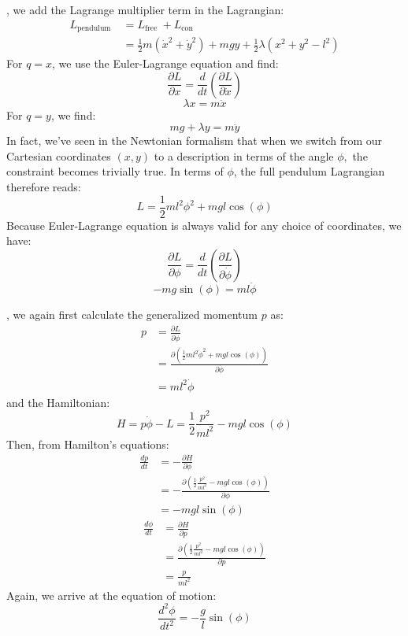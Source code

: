\textbf{}, we add the Lagrange multiplier term in the Lagrangian:
\begin{equation}
\begin{aligned}
L_{\text {pendulum }} &=L_{\text {free }}+L_{\text {con }} \\
&=\frac{1}{2} m\left(\dot{x}^{2}+\dot{y}^{2}\right)+m g y+\frac{1}{2} \lambda\left(x^{2}+y^{2}-l^{2}\right)
\end{aligned}
\end{equation}
For $q=x$, we use the Euler-Lagrange equation and find:
$$
\frac{\partial L}{\partial x}=\frac{d}{d t}\left(\frac{\partial L}{\partial \dot{x}}\right)
$$
$$
\lambda x=m \ddot{x}
$$
For $q=y$, we find:
$$
m g+\lambda y=m\ddot{y}
$$
In fact, we've seen in the Newtonian formalism that when we switch from our Cartesian coordinates $(x, y)$ to a description in terms of the angle $\phi,$ the constraint becomes trivially true. In terms of $\phi$, the full pendulum Lagrangian therefore reads:
$$
L=\frac{1}{2} m l^{2} \phi^{2}+m g l \cos (\phi)
$$
Because Euler-Lagrange equation is always valid for any choice of coordinates, we have:
$$
\frac{\partial L}{\partial \phi}=\frac{d}{d t}\left(\frac{\partial L}{\partial \dot{\phi}}\right)
$$
$$
-m g \sin (\phi)=m l  \ddot{\phi}
$$

\textbf{}, we again first calculate the generalized momentum $p$ as:
$$
\begin{aligned}
p &=\frac{\partial L}{\partial \dot{\phi}} \\
&=\frac{\partial\left(\frac{1}{2} m l^{2} \dot{\phi}^{2}+m g l \cos (\phi)\right)}{\partial \dot{\phi}} \\
&=m l^{2} \dot{\phi}
\end{aligned}
$$
and the Hamiltonian:
$$
H=p\dot{\phi}-L=\frac{1}{2} \frac{p^{2}}{m l^{2}}-m g l \cos (\phi)
$$
Then, from Hamilton's equations:
$$
\begin{aligned}
\frac{d p}{d t} &=-\frac{\partial H}{\partial \phi} \\
&=-\frac{\partial\left(\frac{1}{2} \frac{p^{2}}{m l^{2}}-m g l \cos (\phi)\right)}{\partial \phi} \\
&=-m g l \sin (\phi)
\end{aligned}
$$
$$
\begin{aligned}
\frac{d \phi}{d t} &=\frac{\partial H}{\partial p} \\
&=\frac{\partial\left(\frac{1}{2} \frac{p^{2}}{m l^{2}}-m g l \cos (\phi)\right)}{\partial p} \\
&=\frac{p}{m l^{2}}
\end{aligned}
$$
Again, we arrive at the equation of motion:
$$
\frac{d^{2} \phi}{d t^{2}}=-\frac{g}{l} \sin (\phi)
$$
